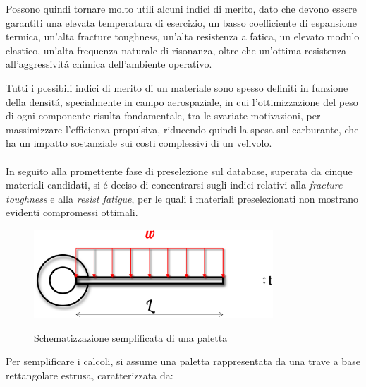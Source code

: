 \documentclass{article}
\begin{document}
        Possono quindi tornare molto utili alcuni indici di merito, dato che devono essere garantiti una elevata temperatura di esercizio, un basso coefficiente di espansione termica, un’alta fracture toughness, un’alta resistenza a fatica, un elevato modulo elastico, un’alta frequenza naturale di risonanza, oltre che un’ottima resistenza all’aggressivitá chimica dell’ambiente operativo. 
        
        Tutti i possibili indici di merito di un materiale sono spesso definiti in funzione della densitá, specialmente in campo aerospaziale, in cui l’ottimizzazione del peso di ogni componente risulta fondamentale, tra le svariate motivazioni, per massimizzare l’efficienza propulsiva, riducendo quindi la spesa sul carburante, che ha un impatto sostanziale sui costi complessivi di un velivolo.
        \\ \\ 
        In seguito alla promettente fase di preselezione sul database,
        superata da cinque materiali candidati, si é deciso di concentrarsi sugli indici relativi alla \textit{fracture toughness} e alla \textit{resist fatigue},
        per le quali i materiali preselezionati non mostrano evidenti compromessi ottimali.

        \begin{figure}[h!]
            \centering
             \label{blade_load}
            \includegraphics[width=0.8\textwidth]{Sources/blade_load.eps}
            \caption{Schematizzazione semplificata di una paletta \autocite{Inkscape}}
        \end{figure}
        \clearpage

        Per semplificare i calcoli, si assume una paletta rappresentata da una trave a base rettangolare
        estrusa, caratterizzata da:
\end{document}

